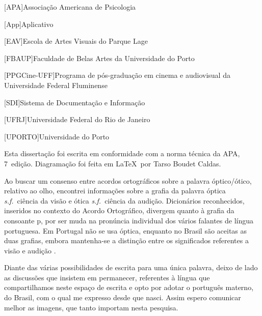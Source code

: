 \begin{acronym}
	[APA]{Associação Americana de Psicologia}

  [App]{Aplicativo}

	[EAV]{Escola de Artes Visuais do Parque Lage}

	[FBAUP]{Faculdade de Belas Artes da Universidade do Porto}

	[PPGCine-UFF]{Programa de pós-graduação em cinema e
		audiovisual da Universidade Federal Fluminense}

	[SDI]{Sistema de Documentação e Informação}

	[UFRJ]{Universidade Federal do Rio de Janeiro}

	[UPORTO]{Universidade do Porto}
\end{acronym}

\clearpage

\begin{authornote}
	Esta dissertação foi escrita em conformidade com a norma técnica da
	APA, 7\textordfeminine~edição. Diagramação foi feita em \LaTeX\ por Tarso Boudet Caldas.

	Ao buscar um consenso entre acordos ortográficos sobre a palavra
	óptico/ótico, relativo ao olho, encontrei informações sobre a grafia da
	palavra óptica \emph{s.f.}~ciência da visão e ótica \emph{s.f.}~ciência
	da audição. Dicionários reconhecidos, inseridos no contexto do Acordo
	Ortográfico, divergem quanto à grafia da consoante p, por ser muda na
	pronúncia individual dos vários falantes de língua portuguesa. Em
	Portugal não se usa óptica, enquanto no Brasil são aceitas as duas
	grafias, embora mantenha-se a distinção entre os significados
	referentes a visão e audição \parencite{ILLLP2015optico}.

	Diante das várias possibilidades de escrita para uma única palavra,
	deixo de lado as discussões que insistem em permanecer, referentes à
	língua que compartilhamos neste espaço de escrita e opto por adotar o
	português materno, do Brasil, com o qual me expresso desde que nasci.
	Assim espero comunicar melhor as imagens, que tanto importam nesta
	pesquisa.
\end{authornote}
